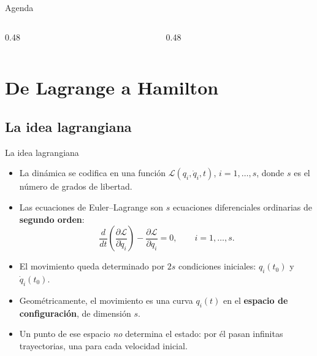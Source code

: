 \documentclass[spanish]{beamer}
\newcommand{\Lag}{\mathcal{L}}               %
\newcommand{\pd}[2]{\frac{\partial #1}{\partial #2}}
\begin{document}
\begin{frame}{Agenda}
\begin{columns}[T]
  \begin{column}{0.48\textwidth}
    \tableofcontents[sections={1-4},hideallsubsections]
  \end{column}
  \begin{column}{0.48\textwidth}
    \tableofcontents[sections={5-9},hideallsubsections]
  \end{column}
\end{columns}
\end{frame}

\section{De Lagrange a Hamilton}

\subsection{La idea lagrangiana}
\begin{frame}{La idea lagrangiana}
\begin{itemize}[<+->]
  \item La dinámica se codifica en una función $\Lag(q_i,\dot q_i,t)$, $i=1,\dots,s$,
        donde $s$ es el número de grados de libertad.
  \item Las ecuaciones de Euler--Lagrange son $s$ ecuaciones diferenciales
        ordinarias de \textbf{segundo orden}:
        \[
          \frac{d}{dt}\left(\pd{\Lag}{\dot q_i}\right)-\pd{\Lag}{q_i}=0,
          \qquad i=1,\dots,s .
        \]
  \item El movimiento queda determinado por $2s$ condiciones iniciales:
        $q_i(t_0)$ y $\dot q_i(t_0)$.
  \item Geométricamente, el movimiento es una curva $q_i(t)$ en el
        \textbf{espacio de configuración}, de dimensión $s$.
  \item Un punto de ese espacio \emph{no} determina el estado: por él pasan
        infinitas trayectorias, una para cada velocidad inicial.
\end{itemize}
\end{frame}
\end{document}
